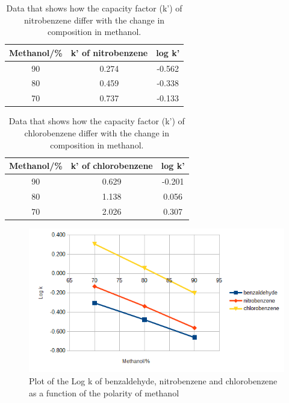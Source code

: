 \documentclass[a4paper, 12pt]{article}
\begin{document}
\begin{table}[h!]
	\centering
	\caption{Data that shows how the capacity factor (k') of nitrobenzene differ with the change in composition in methanol.}
	\begin{tabular}{|c|c|c|}
		\hline
		Methanol/\% & k' of nitrobenzene & log k' \\
		\hline
		90 & 0.274 & -0.562 \\
		\hline
		80 & 0.459 & -0.338 \\
		\hline
		70 & 0.737 & -0.133 \\
		\hline
	\end{tabular}
	\label{tab-cf-nitrobenzene}
\end{table}

\begin{table}[h!]
	\centering
	\caption{Data that shows how the capacity factor (k') of chlorobenzene differ with the change in composition in methanol.}
	\begin{tabular}{|c|c|c|}
		\hline
		Methanol/\% & k' of chlorobenzene & log k' \\
		\hline
		90 & 0.629 & -0.201 \\
		\hline
		80 & 1.138 & 0.056 \\
		\hline
		70 & 2.026 & 0.307 \\
		\hline
	\end{tabular}
	\label{tab-cf-chlorobenzene}
\end{table}

\begin{figure}[h!]
	\centering
	\includegraphics[width=1\textwidth]{fig-capacity-2}
	\caption{Plot of the Log k of benzaldehyde, nitrobenzene and chlorobenzene as a function of the polarity of methanol}
	\label{fig-capacity-factors}
\end{figure}
\end{document}

